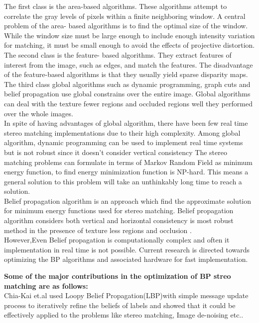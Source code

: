 The first class is the area-based algorithms. These algorithms attempt to correlate the gray levels of pixels within a finite neighboring window. A central problem of the area- based algorithms is to find the optimal size of the window. While the window size must be large enough to include enough intensity variation for matching, it must be small enough to avoid the effects of projective distortion.
The second class is the feature- based algorithms. They extract features of interest from the image, such as edges, and match the features. The disadvantage of the feature-based algorithms is that they usually yield sparse disparity maps.
The third class global algorithms such as dynamic programming, graph cuts and belief propagation use global constrains over the entire image. Global algorithms can deal with the texture fewer regions and occluded regions well they performed over the whole images.\\
In spite of having advantages of global algorithm, there have been few real time stereo matching implementations due to their high complexity. Among global algorithm, dynamic programming can be used to implement real time systems but is not robust since it doesn't consider vertical consistency\cite{Pearl}
The stereo matching problems can formulate in terms of Markov Random Field as minimum energy function, to find energy minimization function is NP-hard. This means a general solution to this problem will take an unthinkably long time to reach a solution.\\
Belief propagation algorithm is an approach which find the approximate solution for minimum energy functions used for stereo matching.\cite{Chia}
Belief propagation algorithm considers both vertical and horizontal consistency is most robust method in the presence of texture less regions and occlusion .\\
However,Even  Belief propagation is computationally complex and often it implementation in real time is not possible.
Current research is directed towards optimizing the BP algorithms and associated hardware for fast implementation.\cite{aps}


\textbf{Some of the major contributions in the optimization of BP streo matching are as follows:}\\
Chia-Kai et.al\cite{Chia} used Loopy Belief Propagation(LBP)with simple message update process to iteratively refine the beliefs of labels and showed that it could be effectively applied to the  problems like stereo matching, Image de-noising etc..

